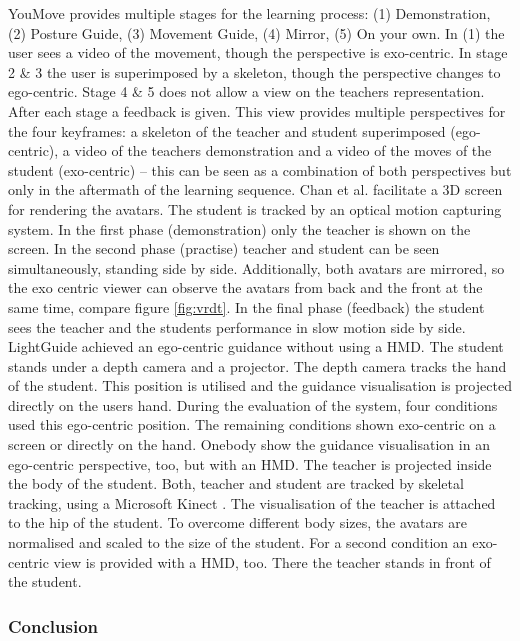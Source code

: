 YouMove \cite{Anderson2013} provides multiple stages for the learning process: (1) Demonstration, (2) Posture Guide, (3) Movement Guide, (4) Mirror, (5) On your own. In (1) the user sees a video of the movement, though the perspective is exo-centric. In stage 2 \& 3 the user is superimposed by a skeleton, though the perspective changes to ego-centric. Stage 4 \& 5 does not allow a view on the teachers representation. After each stage a feedback is given. This view provides multiple perspectives for the four keyframes: a skeleton of the teacher and student superimposed (ego-centric), a video of the teachers demonstration and a video of the moves of the student (exo-centric) \--- this can be seen as a combination of both perspectives but only in the aftermath of the learning sequence.
Chan et al. \cite{Chan2011} facilitate a 3D screen for rendering the avatars. The student is tracked by an optical motion capturing system. In the first phase (demonstration) only the teacher is shown on the screen. In the second phase (practise) teacher and student can be seen simultaneously, standing side by side. Additionally, both avatars are mirrored, so the exo centric viewer can observe the avatars from back and the front at the same time, compare figure \ref{fig:vrdt}. In the final phase (feedback) the student sees the teacher and the students performance in slow motion side by side.
LightGuide \cite{Sodhi2012} achieved an ego-centric guidance without using a HMD. The student stands under a depth camera and a projector. The depth camera tracks the hand of the student. This position is utilised and the guidance visualisation is projected directly on the users hand. During the evaluation of the system, four conditions used this ego-centric position. The remaining conditions shown exo-centric on a screen or directly on the hand.
Onebody \cite{Hoang2016} show the guidance visualisation in an ego-centric perspective, too, but with an HMD. The teacher is projected inside the body of the student. Both, teacher and student are tracked by skeletal tracking, using a Microsoft Kinect \todo. The visualisation of the teacher is attached to the hip of the student. To overcome different body sizes, the avatars are normalised and scaled to the size of the student. For a second condition an exo-centric view is provided with a HMD, too. There the teacher stands in front of the student.
\subsubsection{Conclusion}

